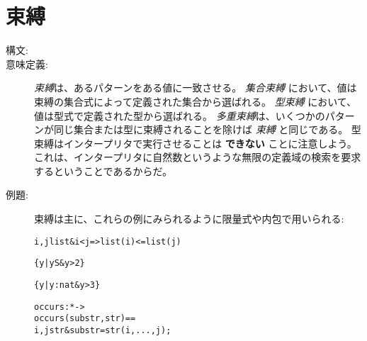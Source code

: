 \documentclass[\pformat,12pt]{jarticle}
\begin{document}
\section{束縛}\label{bind}

\begin{description}
\item[構文:]







\item[意味定義:] {\it 束縛}は、あるパターンをある値に一致させる。
 {\it 集合束縛} において、値は束縛の集合式によって定義された集合から選ばれる。
 {\it 型束縛} において、値は型式で定義された型から選ばれる。
 {\it 多重束縛}は、いくつかのパターンが同じ集合または型に束縛されることを除けば {\it 束縛} と同じである。
型束縛はインタープリタで実行させることは {\bf できない} ことに注意しよう。
これは、インタープリタに自然数というような無限の定義域の検索を要求するということであるからだ。

\item[例題:] 束縛は主に、これらの例にみられるように限量式や内包で用いられる:
  \begin{alltt}
     i, j  list \& i < j => list(i) <= list(j)
      
    \{ y | y  S & y > 2 \}

    \{ y | y: nat & y > 3 \}

    occurs :  *  -> 
    occurs (substr,str) ==
       i,j  str & substr = str(i,...,j);

  \end{alltt}
\end{description}
\end{document}
